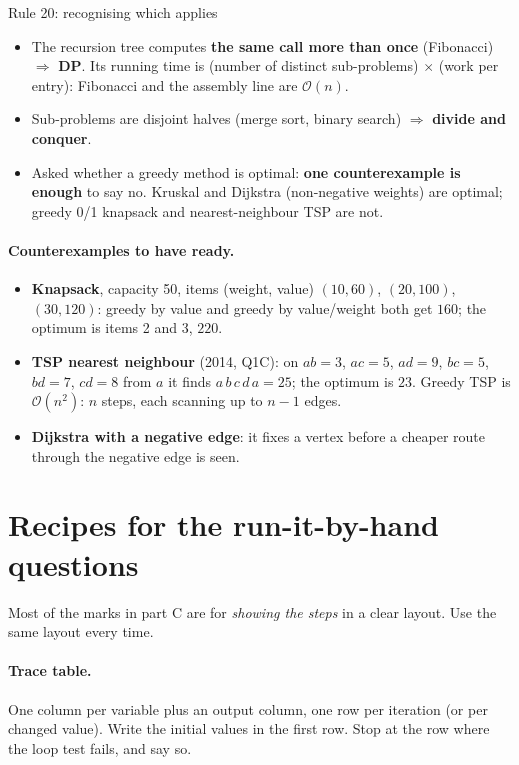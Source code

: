 \documentclass{fkt-notes}
\newcommand{\Oh}{\mathcal{O}}
\begin{document}
\begin{rulebox}{Rule 20: recognising which applies}
\begin{itemize}[leftmargin=1.5em,itemsep=1pt]
  \item The recursion tree computes \textbf{the same call more than once} (Fibonacci) $\Rightarrow$ \textbf{DP}. Its running time is (number of distinct sub-problems) $\times$ (work per entry): Fibonacci and the assembly line are $\Oh(n)$.
  \item Sub-problems are disjoint halves (merge sort, binary search) $\Rightarrow$ \textbf{divide and conquer}.
  \item Asked whether a greedy method is optimal: \textbf{one counterexample is enough} to say no. Kruskal and Dijkstra (non-negative weights) are optimal; greedy 0/1 knapsack and nearest-neighbour TSP are not.
\end{itemize}
\end{rulebox}

\paragraph{Counterexamples to have ready.}
\begin{itemize}[leftmargin=1.5em,itemsep=1pt]
  \item \textbf{Knapsack}, capacity 50, items (weight, value) $(10,60)$, $(20,100)$, $(30,120)$: greedy by value and greedy by value/weight both get $160$; the optimum is items 2 and 3, $220$.
  \item \textbf{TSP nearest neighbour} (2014, Q1C): on $ab=3$, $ac=5$, $ad=9$, $bc=5$, $bd=7$, $cd=8$ from $a$ it finds $a\,b\,c\,d\,a=25$; the optimum is $23$. Greedy TSP is $\Oh(n^2)$: $n$ steps, each scanning up to $n-1$ edges.
  \item \textbf{Dijkstra with a negative edge}: it fixes a vertex before a cheaper route through the negative edge is seen.
\end{itemize}

\section{Recipes for the run-it-by-hand questions}
\label{sec:recipes}

Most of the marks in part C are for \emph{showing the steps} in a clear layout. Use the same layout every time.

\paragraph{Trace table.} One column per variable plus an output column, one row per iteration (or per changed value). Write the initial values in the first row. Stop at the row where the loop test fails, and say so.
\end{document}
